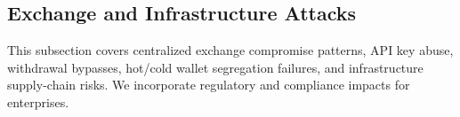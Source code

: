 \subsection{Exchange and Infrastructure Attacks}
This subsection covers centralized exchange compromise patterns, API key abuse, withdrawal bypasses, hot/cold wallet segregation failures, and infrastructure supply-chain risks. We incorporate regulatory and compliance impacts for enterprises.




